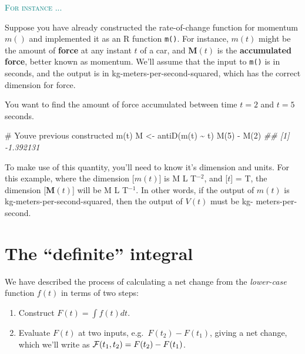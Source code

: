 \documentclass[
  letterpaper,
  DIV=11,
  numbers=noendperiod,
  oneside]{scrreprt}
\newenvironment{Shaded}{\begin{snugshade}}{\end{snugshade}}
\newcommand{\CommentTok}[1]{\textcolor[rgb]{0.37,0.37,0.37}{#1}}
\newcommand{\DecValTok}[1]{\textcolor[rgb]{0.68,0.00,0.00}{#1}}
\newcommand{\DocumentationTok}[1]{\textcolor[rgb]{0.37,0.37,0.37}{\textit{#1}}}
\newcommand{\FunctionTok}[1]{\textcolor[rgb]{0.28,0.35,0.67}{#1}}
\newcommand{\NormalTok}[1]{\textcolor[rgb]{0.00,0.46,0.62}{#1}}
\newcommand{\OtherTok}[1]{\textcolor[rgb]{0.00,0.46,0.62}{#1}}
\newcommand{\SpecialCharTok}[1]{\textcolor[rgb]{0.37,0.37,0.37}{#1}}
\providecommand{\tightlist}{%
  \setlength{\itemsep}{0pt}\setlength{\parskip}{0pt}}
\newenvironment{example}%
{%
\textcolor{teal}{\hrulefill}%
  \par\vspace{.3\baselineskip}%
  \textcolor{teal}{\scshape For instance ...}%
  \par\vspace{\baselineskip}%
}%
{\textcolor{teal}{\hrulefill}}
\begin{document}
\begin{example}
Suppose you have already constructed the rate-of-change function for
momentum \(m()\) and implemented it as an R function \texttt{m()}. For
instance, \(m(t)\) might be the amount of \textbf{force} at any instant
\(t\) of a car, and \({\mathbf M}(t)\) is the \textbf{accumulated
force}, better known as momentum. We'll assume that the input to
\texttt{m()} is in seconds, and the output is in
kg-meters-per-second-squared, which has the correct dimension for force.

You want to find the amount of force accumulated between time \(t=2\)
and \(t=5\) seconds.

\begin{Shaded}
\begin{Highlighting}[]
\CommentTok{\# You\textquotesingle{}ve previous constructed m(t)}
\NormalTok{M }\OtherTok{\textless{}{-}} \FunctionTok{antiD}\NormalTok{(}\FunctionTok{m}\NormalTok{(t) }\SpecialCharTok{\textasciitilde{}}\NormalTok{ t)}
\FunctionTok{M}\NormalTok{(}\DecValTok{5}\NormalTok{) }\SpecialCharTok{{-}} \FunctionTok{M}\NormalTok{(}\DecValTok{2}\NormalTok{)}
\DocumentationTok{\#\# [1] {-}1.392131}
\end{Highlighting}
\end{Shaded}

To make use of this quantity, you'll need to know it's dimension and
units. For this example, where the dimension {[}\(m(t)\){]} is M L
T\(^{-2}\), and {[}\(t\){]} = T, the dimension {[}\({\mathbf M}(t)\){]}
will be M L T\(^{-1}\). In other words, if the output of \(m(t)\) is
kg-meters-per-second-squared, then the output of \(V(t)\) must be kg-
meters-per-second.

\end{example}

\hypertarget{the-definite-integral}{%
\section{The ``definite'' integral}\label{the-definite-integral}}

We have described the process of calculating a net change from the
\emph{lower-case} function \(f(t)\) in terms of two steps:

\begin{enumerate}
\def\labelenumi{\arabic{enumi}.}
\tightlist
\item
  Construct \(F(t) = \int f(t) dt\).
\item
  Evaluate \(F(t)\) at two inputs, e.g.~\(F(t_2) - F(t_1)\), giving a
  net change, which we'll write as
  \({\cal F}(t_1, t_2) = F(t_2) - F(t_1)\).
\end{enumerate}
\end{document}
